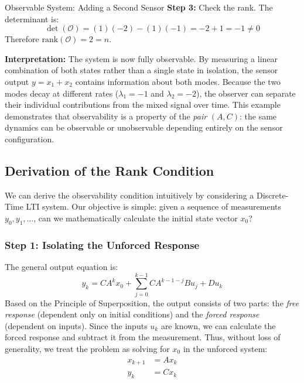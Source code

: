 \begin{examplebox}{Observable System: Adding a Second Sensor}
\textbf{Step 3:} Check the rank. The determinant is:
\begin{equation*}
	\det(\mathcal{O}) = (1)(-2) - (1)(-1) = -2 + 1 = -1 \neq 0
\end{equation*}
Therefore $\text{rank}(\mathcal{O}) = 2 = n$.

\textbf{Interpretation:} The system is now fully observable. By measuring a linear combination of both states rather than a single state in isolation, the sensor output $y = x_1 + x_2$ contains information about both modes. Because the two modes decay at different rates ($\lambda_1 = -1$ and $\lambda_2 = -2$), the observer can separate their individual contributions from the mixed signal over time. This example demonstrates that observability is a property of the \textit{pair} $(A, C)$: the same dynamics can be observable or unobservable depending entirely on the sensor configuration.
\end{examplebox}

\subsection{Derivation of the Rank Condition}

We can derive the observability condition intuitively by considering a Discrete-Time LTI system. Our objective is simple: given a sequence of measurements $y_0, y_1, \dots$, can we mathematically calculate the initial state vector $x_0$?

\subsubsection*{Step 1: Isolating the Unforced Response}
The general output equation is:
\begin{equation*}
	y_k = C A^k x_0 + \sum_{j=0}^{k-1} C A^{k-1-j} B u_j + D u_k
\end{equation*}
Based on the {Principle of Superposition}, the output consists of two parts: the \textit{free response} (dependent only on initial conditions) and the \textit{forced response} (dependent on inputs). Since the inputs $u_k$ are known, we can calculate the forced response and subtract it from the measurement. Thus, without loss of generality, we treat the problem as solving for $x_0$ in the unforced system:
\begin{align*}
	x_{k+1} &= A x_k \\
	y_k &= C x_k
\end{align*}

